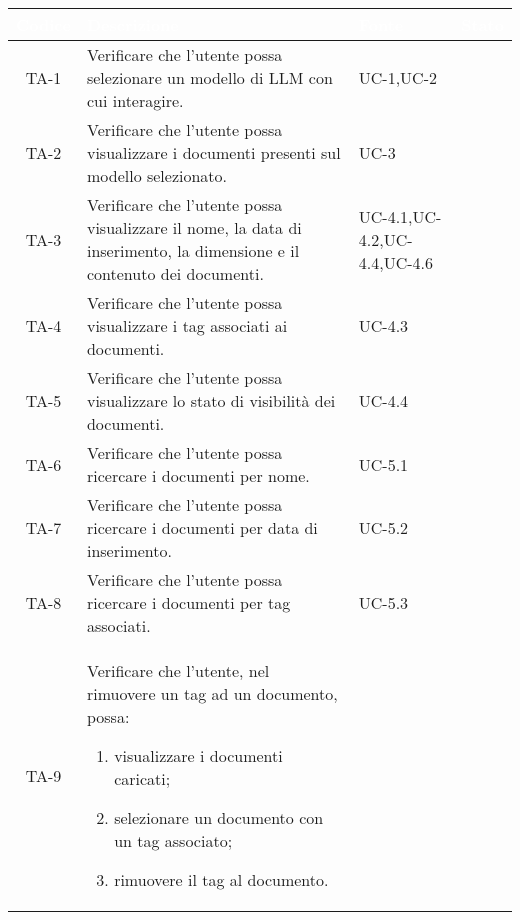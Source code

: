 \begingroup
\setlength{\tabcolsep}{10pt}
\renewcommand{\arraystretch}{1.5}
\begin{xltabular}{\textwidth}{| c | X | X | c |}
    \hline
     \textbf{\textcolor{white}{Codice}} & \textbf{\textcolor{white}{Descrizione}} & \textbf{\textcolor{white}{Fonte}} & \textbf{\textcolor{white}{Stato}}\\
    \hline
    \endhead
    \hline
    TA-1 & Verificare che l’utente possa selezionare un modello di LLM con cui interagire. & UC-1,\newline UC-2 & \textcolor{cmarkcolor}{}  \\
    \hline
    TA-2 & Verificare che l’utente possa visualizzare i documenti presenti sul modello selezionato.
     & UC-3 &\textcolor{cmarkcolor}{}  \\
    \hline
    TA-3 & Verificare che l’utente possa visualizzare il nome,  la data di inserimento, la dimensione e il contenuto dei documenti.
     & UC-4.1,\newline UC-4.2,\newline UC-4.4,\newline UC-4.6 &\textcolor{cmarkcolor}{}  \\
    \hline
    TA-4 & Verificare che l’utente possa visualizzare i tag associati ai documenti.
     & UC-4.3 &\textcolor{cmarkcolor}{}  \\
    \hline
    TA-5 & Verificare che l’utente possa visualizzare lo stato di visibilità dei documenti.
     & UC-4.4 &\textcolor{cmarkcolor}{}  \\
    \hline
    TA-6 & Verificare che l’utente possa ricercare i documenti per nome. & UC-5.1 & \textcolor{cmarkcolor}{}  \\
    \hline
    TA-7 & Verificare che l’utente possa ricercare i documenti per data di inserimento. & UC-5.2 & \textcolor{cmarkcolor}{}  \\
    \hline
    TA-8 & Verificare che l’utente possa ricercare i documenti per tag associati. & UC-5.3 & \textcolor{xmarkcolor}{}  \\
    \hline
    TA-9 & Verificare che l’utente, nel rimuovere un tag ad un documento, possa:
    \begin{enumerate}
        \item visualizzare i documenti caricati;
        \item selezionare un documento con un tag associato;
        \item rimuovere il tag al documento.

\end{enumerate}
\end{xltabular}
